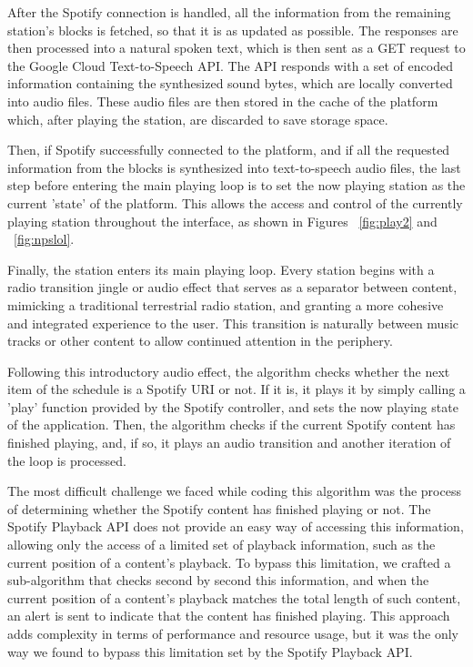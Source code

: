 After the Spotify connection is handled, all the information from the remaining station's blocks is fetched, so that it is as updated as possible. The responses are then processed into a natural spoken text, which is then sent as a GET request to the Google Cloud Text-to-Speech API. The API responds with a set of encoded information containing the synthesized sound bytes, which are locally converted into audio files. These audio files are then stored in the cache of the platform which, after playing the station, are discarded to save storage space.

Then, if Spotify successfully connected to the platform, and if all the requested information from the blocks is synthesized into text-to-speech audio files, the last step before entering the main playing loop is to set the now playing station as the current 'state' of the platform. This allows the access and control of the currently playing station throughout the interface, as shown in Figures ~\ref{fig:play2} and ~\ref{fig:npslol}.

Finally, the station enters its main playing loop. Every station begins with a radio transition jingle or audio effect that serves as a separator between content, mimicking a traditional terrestrial radio station, and granting a more cohesive and integrated experience to the user. This transition is naturally between music tracks or other content to allow continued attention in the periphery.

Following this introductory audio effect, the algorithm checks whether the next item of the schedule is a Spotify \ac{URI} or not. If it is, it plays it by simply calling a 'play' function provided by the Spotify controller, and sets the now playing state of the application. Then, the algorithm checks if the current Spotify content has finished playing, and, if so, it plays an audio transition and another iteration of the loop is processed.

The most difficult challenge we faced while coding this algorithm was the process of determining whether the Spotify content has finished playing or not. The Spotify Playback \ac{API} does not provide an easy way of accessing this information, allowing only the access of a limited set of playback information, such as the current position of a content's playback. To bypass this limitation, we crafted a sub-algorithm that checks second by second this information, and when the current position of a content's playback matches the total length of such content, an alert is sent to indicate that the content has finished playing. This approach adds complexity in terms of performance and resource usage, but it was the only way we found to bypass this limitation set by the Spotify Playback \ac{API}.

